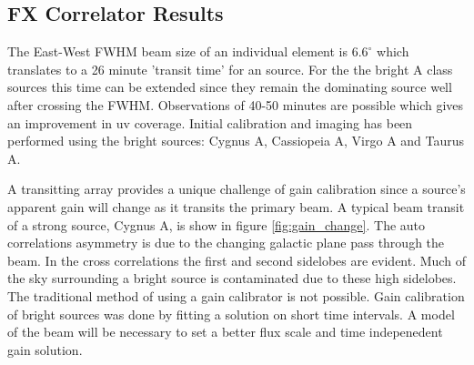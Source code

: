 \documentclass[useAMS,macros,usenatbib,onecolumn]{mn2e}
\begin{document}
\subsection{FX Correlator Results}
\label{fx results}

The East-West FWHM beam size of an individual element is $6.6^{\circ}$ which translates to a 26 minute 'transit time' for an source.
For the the bright A class sources this time can be extended since they remain the dominating source well after crossing the FWHM.
Observations of 40-50 minutes are possible which gives an improvement in uv coverage.
Initial calibration and imaging has been performed using the bright sources: Cygnus A, Cassiopeia A, Virgo A and Taurus A.

A transitting array provides a unique challenge of gain calibration since a source's apparent gain will change as it transits the primary beam.
A typical beam transit of a strong source, Cygnus A, is show in figure \ref{fig:gain_change}.
The auto correlations asymmetry is due to the changing galactic plane pass through the beam.
In the cross correlations the first and second sidelobes are evident.
Much of the sky surrounding a bright source is contaminated due to these high sidelobes.
The traditional method of using a gain calibrator is not possible.
Gain calibration of bright sources was done by fitting a solution on short time intervals.
A model of the beam will be necessary to set a better flux scale and time indepenedent gain solution.
\end{document}
